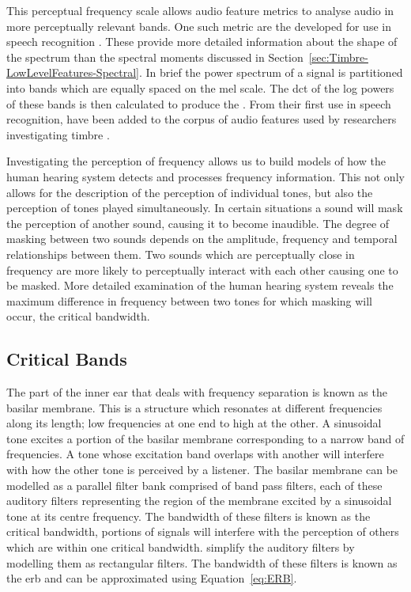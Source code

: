 		This perceptual frequency scale allows audio feature metrics to analyse audio in more perceptually relevant
		bands. One such metric are the  developed for use in speech recognition
		\citep{davis1980comparison}. These provide more detailed information about the shape of the spectrum than
		the spectral moments discussed in Section~\ref{sec:Timbre-LowLevelFeatures-Spectral}. In brief the power
		spectrum of a signal is partitioned into bands which are equally spaced on the mel scale.  The
		\acrfull{dct} of the log powers of these bands is then calculated to produce the . From
		their first use in speech recognition,  have been added to the corpus of audio features
		used by researchers investigating timbre \citep{depoli1997sonological}. 

		Investigating the perception of frequency allows us to build models of how the human hearing system detects
		and processes frequency information. This not only allows for the description of the perception of
		individual tones, but also the perception of tones played simultaneously. In certain situations a sound
		will mask the perception of another sound, causing it to become inaudible. The degree of masking between
		two sounds depends on the amplitude, frequency and temporal relationships between them. Two sounds which
		are perceptually close in frequency are more likely to perceptually interact with each other causing one to
		be masked. More detailed examination of the human hearing system reveals the maximum difference in
		frequency between two tones for which masking will occur, the critical bandwidth.

	\subsection{Critical Bands}
	\label{sec:Timbre-PsychoacousticPrinciples-CriticalBands}
		The part of the inner ear that deals with frequency separation is known as the basilar membrane. This is a
		structure which resonates at different frequencies along its length; low frequencies at one end to high at
		the other. A sinusoidal tone excites a portion of the basilar membrane corresponding to a narrow band of
		frequencies. A tone whose excitation band overlaps with another will interfere with how the other tone is
		perceived by a listener. The basilar membrane can be modelled as a parallel filter bank comprised of band
		pass filters, each of these auditory filters representing the region of the membrane excited by a
		sinusoidal tone at its centre frequency. The bandwidth of these filters is known as the critical bandwidth,
		portions of signals will interfere with the perception of others which are within one critical bandwidth.
		\citet{glasberg1990derivation} simplify the auditory filters by modelling them as rectangular filters. The
		bandwidth of these filters is known as the \acrfull{erb} and can be approximated using
		Equation~\ref{eq:ERB}.

